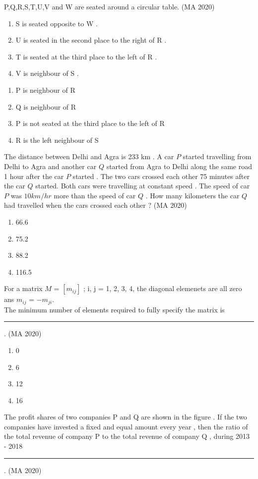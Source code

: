 \item P,Q,R,S,T,U,V and W are seated around a circular table.
\hfill{(MA 2020)}
\begin{enumerate}
\item S is seated opposite to W .
\item U is seated in the second place to the right of R .
\item T is seated at the third place to the left of R .
\item V is neighbour of S .
\end{enumerate}

\begin{enumerate}
\item P is neighbour of R
\item Q is neighbour of R
\item P is not seated at the third place to the left of R
\item R is the left neighbour of S 
\end{enumerate}

\item The distance between Delhi and Agra is 233 km . A car $P$ started travelling from Delhi to Agra and another car $Q$ started from Agra to Delhi along the same road 1 hour after the car $P$ started . The two cars crossed each other 75 minutes after the car $Q$ started. Both cars were travelling at constant speed . The speed of car $P$ was $10 km/hr$ more than the speed of car $Q$ . How many kilometers the car $Q$ had travelled when the cars crossed each other ? 
\hfill{(MA 2020)}
\begin{enumerate}
\item 66.6
\item 75.2
\item 88.2
\item 116.5
\end{enumerate}
\item For a matrix $M$ = $[m_{ij}]$ ; i, j = 1, 2, 3, 4, the diagonal elemenets are all zero ans $m_{ij}$ = $-m_{ji}$.\\The minimum number of elements required to fully specify the matrix is \rule{2cm}{0.4pt}.
\hfill{(MA 2020)}
\begin{enumerate}
\item 0
\item 6
\item 12
\item 16
\end{enumerate}

\item The profit shares of two companies P and Q are shown in the figure . If the two companies have invested a fixed and equal amount every year , then the ratio of the total revenue of company P to the total revenue of company Q , during 2013 - 2018 \rule{2cm}{0.4pt}.
\hfill{(MA 2020)}

